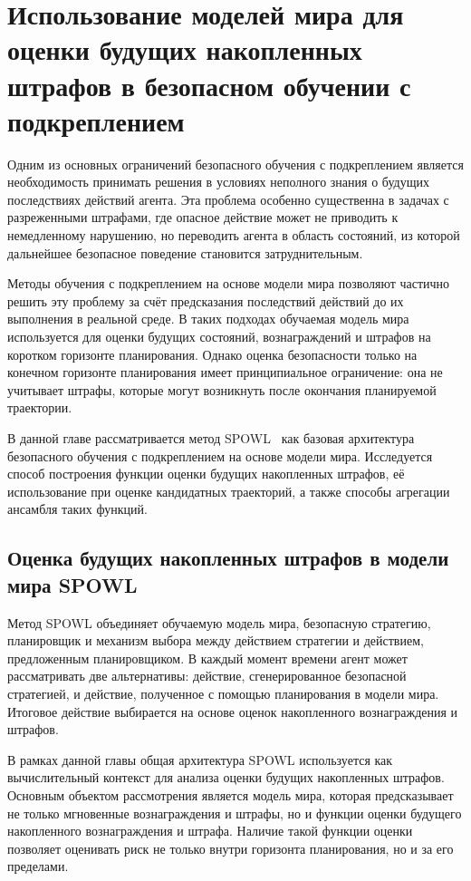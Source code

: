 ﻿%
\chapter{Использование моделей мира для оценки будущих накопленных штрафов в безопасном обучении с подкреплением}
\label{ch:world_models}

Одним из основных ограничений безопасного обучения с подкреплением является необходимость принимать решения в условиях неполного знания о будущих последствиях действий агента. Эта проблема особенно существенна в задачах с разреженными штрафами, где опасное действие может не приводить к немедленному нарушению, но переводить агента в область состояний, из которой дальнейшее безопасное поведение становится затруднительным.

Методы обучения с подкреплением на основе модели мира позволяют частично решить эту проблему за счёт предсказания последствий действий до их выполнения в реальной среде. В таких подходах обучаемая модель мира используется для оценки будущих состояний, вознаграждений и штрафов на коротком горизонте планирования. Однако оценка безопасности только на конечном горизонте планирования имеет принципиальное ограничение: она не учитывает штрафы, которые могут возникнуть после окончания планируемой траектории.

В данной главе рассматривается метод SPOWL~\cite{latyshev2025spowl} как базовая архитектура безопасного обучения с подкреплением на основе модели мира. Исследуется способ построения функции оценки будущих накопленных штрафов, её использование при оценке кандидатных траекторий, а также способы агрегации ансамбля таких функций.

\section{Оценка будущих накопленных штрафов в модели мира SPOWL}
\label{sec:spowl_long_term_cost}

Метод SPOWL объединяет обучаемую модель мира, безопасную стратегию, планировщик и механизм выбора между действием стратегии и действием, предложенным планировщиком. В каждый момент времени агент может рассматривать две альтернативы: действие, сгенерированное безопасной стратегией, и действие, полученное с помощью планирования в модели мира. Итоговое действие выбирается на основе оценок накопленного вознаграждения и штрафов.

В рамках данной главы общая архитектура SPOWL используется как вычислительный контекст для анализа оценки будущих накопленных штрафов. Основным объектом рассмотрения является модель мира, которая предсказывает не только мгновенные вознаграждения и штрафы, но и функции оценки будущего накопленного вознаграждения и штрафа. Наличие такой функции оценки позволяет оценивать риск не только внутри горизонта планирования, но и за его пределами.

